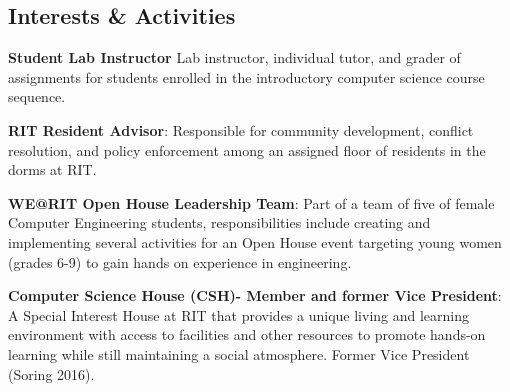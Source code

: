 \documentclass[a4paper,margin,line]{resume}
\begin{document}
\begin{resume}
\section{\mysidestyle Interests \& Activities}
    \begin{asparablank}
    \item \textbf{Student Lab Instructor}
        Lab instructor, individual tutor, and grader of assignments for students enrolled in the 
        introductory computer science course sequence.
        \normalsize
        \\
        \item \textbf{RIT Resident Advisor}: Responsible for community development, conflict resolution, and policy enforcement among an assigned floor of residents in the dorms at RIT.\\
        \item \textbf{WE@RIT Open House Leadership Team}: Part of a team of five of female Computer Engineering students, 
        responsibilities include creating and implementing several activities for an Open House event targeting young women (grades 6-9) 
        to gain hands on experience in engineering.\\
        \item \textbf{Computer Science House (CSH)- Member and former Vice President}: A Special Interest House at RIT that
            provides a unique living and learning environment with access to facilities and other resources to promote hands-on learning while still maintaining a social atmosphere.  Former Vice President (Soring 2016).\\
    \end{asparablank}
\end{resume}
\end{document}
